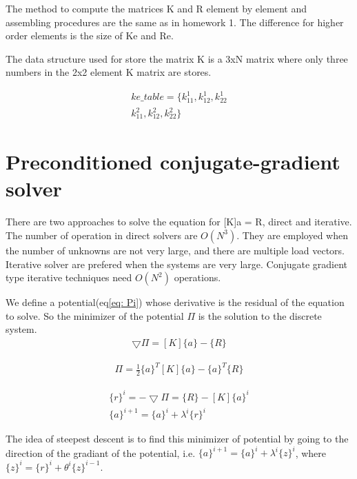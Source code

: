 \documentclass[paper=a4, fontsize=11pt]{article} %
\begin{document}
The method to compute the matrices K and R element by element and assembling procedures are the same as in homework 1. The difference for higher order elements is the size of Ke and Re.   

The data structure used for store the matrix K is a 3xN matrix where only three numbers in the 2x2 element K matrix are stores.

\begin{eqnarray}
ke\_table = \{ k_{11}^1, k_{12}^1, k_{22}^1 \\
               k_{11}^2, k_{12}^2, k_{22}^2 \} 
\end{eqnarray}
 
\section{Preconditioned conjugate-gradient solver}
There are two approaches to solve the equation for [K]{a} = {R}, direct and iterative. The number of operation in direct solvers are  $O(N^3)$. They are employed when the number of unknowns are not very large, and there are multiple load vectors. Iterative solver are prefered when the systems are very large. Conjugate gradient type iterative techniques need $O(N^2)$ operations. 

We define a potential(eq\ref{eq: Pi}) whose derivative is the residual of the equation to solve. So the minimizer of the potential $\Pi$ is the solution to the discrete system. 
\begin{eqnarray}
\bigtriangledown \Pi = [K]\{a\} - \{R\}
\end{eqnarray}

\begin{eqnarray}
\label{eq: Pi}
\Pi = \frac{1}{2} \{a\}^T [K] \{a\} - \{a\}^T\{R\}
\end{eqnarray}

\begin{eqnarray}
\label{eq: residual}
\{r\}^i = - \bigtriangledown \Pi = \{R\} - [K] \{a\}^i \nonumber\\
\{a\}^{i+1} = \{a\}^i + \lambda^i \{r\}^i
\end{eqnarray}

The idea of steepest descent is to find this minimizer of potential by going to the direction of the gradiant of the potential, i.e. $\{a\} ^{i+1} = \{a\} ^i + \lambda ^i \{z\} ^i $, where $\{z\}^i = \{r\}^i + \theta ^i\{z\}^{i-1}$.
\end{document}

